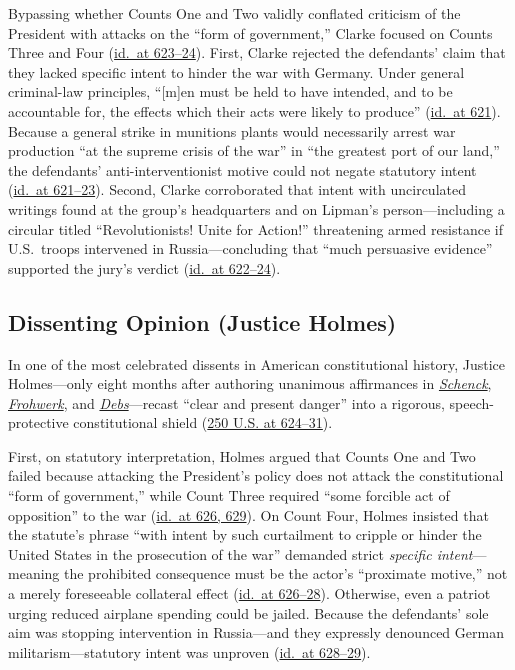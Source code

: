 \documentclass[12pt]{article}
\begin{document}
Bypassing whether Counts One and Two validly conflated criticism of the President with attacks on the ``form of government,'' Clarke focused on Counts Three and Four (\href{https://supreme.justia.com/cases/federal/us/250/616/}{id.\ at 623--24}). First, Clarke rejected the defendants' claim that they lacked specific intent to hinder the war with Germany. Under general criminal-law principles, ``[m]en must be held to have intended, and to be accountable for, the effects which their acts were likely to produce'' (\href{https://supreme.justia.com/cases/federal/us/250/616/}{id.\ at 621}). Because a general strike in munitions plants would necessarily arrest war production ``at the supreme crisis of the war'' in ``the greatest port of our land,'' the defendants' anti-interventionist motive could not negate statutory intent (\href{https://supreme.justia.com/cases/federal/us/250/616/}{id.\ at 621--23}). Second, Clarke corroborated that intent with uncirculated writings found at the group's headquarters and on Lipman's person---including a circular titled ``Revolutionists! Unite for Action!'' threatening armed resistance if U.S.\ troops intervened in Russia---concluding that ``much persuasive evidence'' supported the jury's verdict (\href{https://supreme.justia.com/cases/federal/us/250/616/}{id.\ at 622--24}).

\subsection{Dissenting Opinion (Justice Holmes)}

In one of the most celebrated dissents in American constitutional history, Justice Holmes---only eight months after authoring unanimous affirmances in \href{https://supreme.justia.com/cases/federal/us/249/47/}{\emph{Schenck}}, \href{https://supreme.justia.com/cases/federal/us/249/204/}{\emph{Frohwerk}}, and \href{https://supreme.justia.com/cases/federal/us/249/211/}{\emph{Debs}}---recast ``clear and present danger'' into a rigorous, speech-protective constitutional shield (\href{https://supreme.justia.com/cases/federal/us/250/616/}{250 U.S. at 624--31}).

First, on statutory interpretation, Holmes argued that Counts One and Two failed because attacking the President's policy does not attack the constitutional ``form of government,'' while Count Three required ``some forcible act of opposition'' to the war (\href{https://supreme.justia.com/cases/federal/us/250/616/}{id.\ at 626, 629}). On Count Four, Holmes insisted that the statute's phrase ``with intent by such curtailment to cripple or hinder the United States in the prosecution of the war'' demanded strict \emph{specific intent}---meaning the prohibited consequence must be the actor's ``proximate motive,'' not a merely foreseeable collateral effect (\href{https://supreme.justia.com/cases/federal/us/250/616/}{id.\ at 626--28}). Otherwise, even a patriot urging reduced airplane spending could be jailed. Because the defendants' sole aim was stopping intervention in Russia---and they expressly denounced German militarism---statutory intent was unproven (\href{https://supreme.justia.com/cases/federal/us/250/616/}{id.\ at 628--29}).
\end{document}
